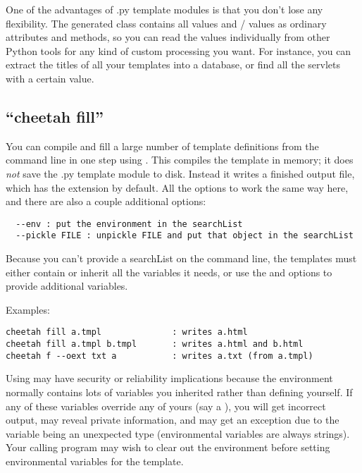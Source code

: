 One of the advantages of .py template modules is that you don't lose any
flexibility.  The generated class contains all  values and
/ values as ordinary attributes and methods, so you
can read the values individually from other Python tools for any kind of custom
processing you want.  For instance, you can extract the titles of all
your templates into a database, or find all the servlets with a certain
 value.

\subsection{``cheetah fill''}
\label{howWorks.cheetah-fill}

You can compile and fill a large number of template definitions from the
command line in one step using .  This compiles the template
in memory; it does {\em not} save the .py template module to disk.  Instead it
writes a finished output file, which has the extension  by default.
All the options to  work the same way here, and there are
also a couple additional options:
\begin{verbatim}
  --env : put the environment in the searchList
  --pickle FILE : unpickle FILE and put that object in the searchList
\end{verbatim}

Because you can't provide a searchList on the command line, the 
templates must either contain or inherit all the variables it needs,
or use the  and  options to
provide additional variables.  

Examples:
\begin{verbatim}
cheetah fill a.tmpl              : writes a.html
cheetah fill a.tmpl b.tmpl       : writes a.html and b.html
cheetah f --oext txt a           : writes a.txt (from a.tmpl)
\end{verbatim}

Using  may have security or reliability implications because the
environment normally contains lots of variables you inherited rather than
defining yourself.  If any of these variables override any of yours (say a
), you will get incorrect output, may reveal private information,
and may get an exception due to the variable being an unexpected type
(environmental variables are always strings).  Your calling program may wish
to clear out the environment before setting environmental variables for the
template.

